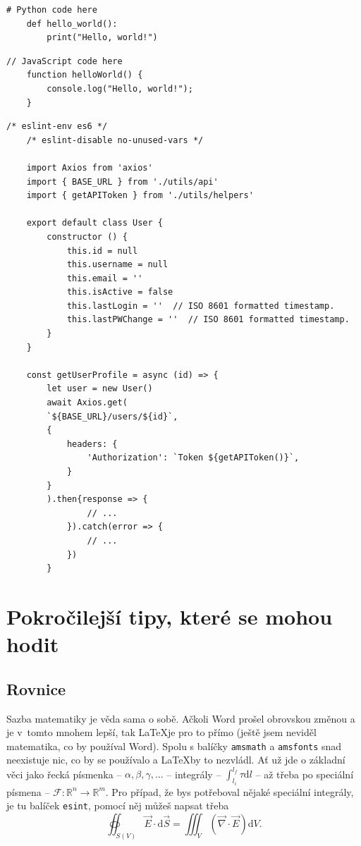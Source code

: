 \documentclass[12pt, a4paper,
oneside,      %
openany
]{report}
\newcommand{\dif}{\mathrm{d}} %
\begin{document}
\begin{lstlisting}[style=Python, caption={Ukázka Python kódu}]
	# Python code here
	def hello_world():
		print("Hello, world!")
\end{lstlisting}


\begin{lstlisting}[style=JavaScript, title={Kód}, caption={Ukázka JS kódu}]
	// JavaScript code here
	function helloWorld() {
		console.log("Hello, world!");
	}
\end{lstlisting}	
	
\begin{lstlisting}[style=ES6, caption={ES6 (ECMAScript-2015) Listing}]
	/* eslint-env es6 */
	/* eslint-disable no-unused-vars */
	
	import Axios from 'axios'
	import { BASE_URL } from './utils/api'
	import { getAPIToken } from './utils/helpers'
	
	export default class User {
		constructor () {
			this.id = null
			this.username = null
			this.email = ''
			this.isActive = false
			this.lastLogin = ''  // ISO 8601 formatted timestamp.
			this.lastPWChange = ''  // ISO 8601 formatted timestamp.
		}
	}
	
	const getUserProfile = async (id) => {
		let user = new User()
		await Axios.get(
		`${BASE_URL}/users/${id}`,
		{
			headers: {
				'Authorization': `Token ${getAPIToken()}`,
			}
		}
		).then{response => {
				// ...
			}).catch(error => {
				// ...
			})
		}
\end{lstlisting}	
	
	\section[Pokročilejší tipy]{Pokročilejší tipy, které se mohou hodit}
	
	\subsection{Rovnice}
	
	Sazba matematiky je věda sama o sobě. Ačkoli Word prošel obrovskou změnou a je v~tomto mnohem lepší, tak \LaTeX je pro to přímo (ještě jsem neviděl matematika, co by používal Word). Spolu s balíčky \texttt{amsmath} a \texttt{amsfonts} snad neexistuje nic, co by se používalo a \LaTeX by to nezvládl. Ať už jde o základní věci jako řecká písmenka -- $\alpha, \beta, \gamma, \dots$ -- integrály -- $\int_{l_i}^{l_f} \tau \dif l $ -- až třeba po speciální písmena -- $\mathscr{F}: \mathbb{R}^n \to \mathbb{R}^m$. Pro případ, že bys potřeboval nějaké speciální integrály, je tu balíček \texttt{esint}, pomocí něj můžeš napsat třeba
	$$ \oiint_{S(V)} \vec{E} \cdot \dif \vec{S} = \iiint_{V} \left(\vec{\nabla} \cdot \vec{E}\right) \dif V .$$
	
\end{document}
